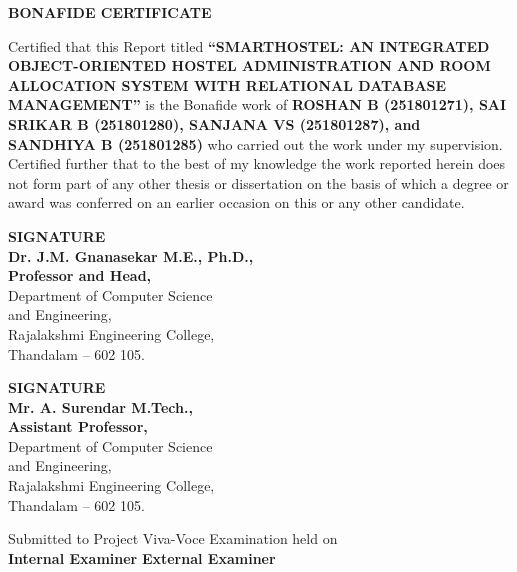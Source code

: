 \documentclass[12pt,a4paper]{report}
\begin{document}
\setcounter{page}{1}

\begin{center}
{\Large \textbf{BONAFIDE CERTIFICATE}\par}
\end{center}
\vspace{0.6cm}

Certified that this Report titled \textbf{``SMARTHOSTEL: AN INTEGRATED OBJECT-ORIENTED HOSTEL ADMINISTRATION AND ROOM ALLOCATION SYSTEM WITH RELATIONAL DATABASE MANAGEMENT''} is the Bonafide work of \textbf{ROSHAN B (251801271), SAI SRIKAR B (251801280), SANJANA VS (251801287), and SANDHIYA B (251801285)} who carried out the work under my supervision. Certified further that to the best of my knowledge the work reported herein does not form part of any other thesis or dissertation on the basis of which a degree or award was conferred on an earlier occasion on this or any other candidate.

\vspace{2.2cm}

\noindent
\begin{minipage}[t]{0.48\textwidth}
\textbf{SIGNATURE}\\[0.2cm]
\textbf{Dr. J.M. Gnanasekar M.E., Ph.D.,}\\
\textbf{Professor and Head,}\\
Department of Computer Science\\
and Engineering,\\
Rajalakshmi Engineering College,\\
Thandalam -- 602 105.
\end{minipage}
\hfill
\begin{minipage}[t]{0.48\textwidth}
\textbf{SIGNATURE}\\[0.2cm]
\textbf{Mr. A. Surendar M.Tech.,}\\
\textbf{Assistant Professor,}\\
Department of Computer Science\\
and Engineering,\\
Rajalakshmi Engineering College,\\
Thandalam -- 602 105.
\end{minipage}

\vspace{2.5cm}
\noindent Submitted to Project Viva-Voce Examination held on \underline{\hspace{4cm}}\\[1.5cm]
\noindent
\textbf{Internal Examiner} \hfill \textbf{External Examiner}
\end{document}
